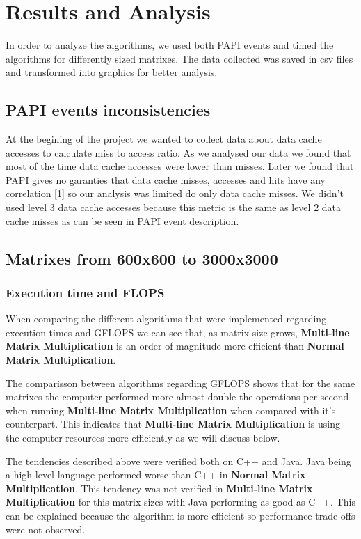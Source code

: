 \section{Results and Analysis}

In order to analyze the algorithms, we used both PAPI events and timed the algorithms for differently sized matrixes.
The data collected was saved in csv files and transformed into graphics for better analysis.

\subsection{PAPI events inconsistencies}

At the begining of the project we wanted to collect data about data cache accesses to calculate miss to access ratio.
As we analysed our data we found that most of the time data cache accesses were lower than misses. Later we found that PAPI gives no garanties that data cache misses, accesses and hits have any correlation [1] so our analysis was limited do only data cache misses. We didn't used level 3 data cache accesses because this metric is the same as level 2 data cache misses as can be seen in PAPI event description. 

\subsection{Matrixes from 600x600 to 3000x3000}

\subsubsection{Execution time and \uppercase{FLOPS}}

When comparing the different algorithms that were implemented regarding execution times and \uppercase{GFLOPS} we can see that, as matrix size grows, \textbf{Multi-line Matrix Multiplication} is an order of magnitude more efficient than \textbf{Normal Matrix Multiplication}. 

The comparisson between algorithms regarding GFLOPS shows that for the same matrixes the computer performed more almost double the operations per second when running \textbf{Multi-line Matrix Multiplication} when compared with it's counterpart. This indicates that \textbf{Multi-line Matrix Multiplication} is using the computer resources more efficiently as we will discuss below.

The tendencies described above were verified both on C++ and Java. Java being a high-level language performed worse than C++ in \textbf{Normal Matrix Multiplication}. This tendency was not verified in \textbf{Multi-line Matrix Multiplication} for this matrix sizes with Java performing as good as C++. This can be explained because the algorithm is more efficient so performance trade-offs were not observed.

